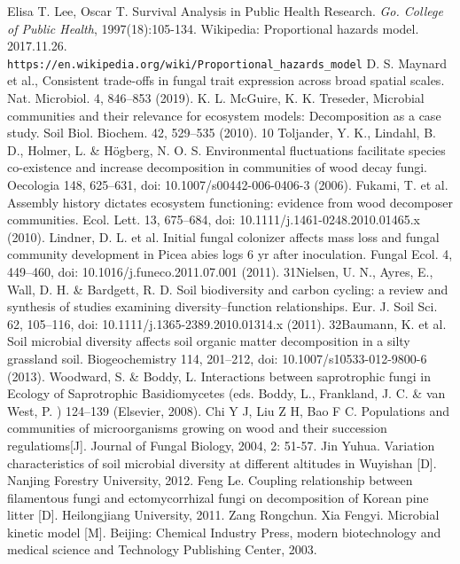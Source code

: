 \documentclass[12pt]{article}
\begin{document}
\begin{thebibliography}{99} 
Elisa T. Lee, Oscar T. Survival Analysis in Public Health Research. \emph{Go. College of Public Health}, 1997(18):105-134.
Wikipedia: Proportional hazards model. 2017.11.26. \texttt{\\https://en.wikipedia.org/wiki/Proportional\_{}hazards\_{}model}
D. S. Maynard et al., Consistent trade-offs in fungal trait expression across broad
spatial scales. Nat. Microbiol. 4, 846–853 (2019).
K. L. McGuire, K. K. Treseder, Microbial communities and their relevance for ecosystem models: Decomposition as a case study. Soil Biol. Biochem. 42, 529–535 (2010).
10 Toljander, Y. K., Lindahl, B. D., Holmer, L. \& Högberg, N. O. S. Environmental fluctuations facilitate species co-existence and increase decomposition in communities of wood decay fungi. Oecologia 148, 625–631, doi: 10.1007/s00442-006-0406-3 (2006).
Fukami, T. et al. Assembly history dictates ecosystem functioning: evidence from wood decomposer communities. Ecol. Lett. 13, 675–684, doi: 10.1111/j.1461-0248.2010.01465.x (2010).
Lindner, D. L. et al. Initial fungal colonizer affects mass loss and fungal community development in Picea abies logs 6 yr after inoculation. Fungal Ecol. 4, 449–460, doi: 10.1016/j.funeco.2011.07.001 (2011).
31Nielsen, U. N., Ayres, E., Wall, D. H. \& Bardgett, R. D. Soil biodiversity and carbon cycling: a review and synthesis of studies examining diversity–function relationships. Eur. J. Soil Sci. 62, 105–116, doi: 10.1111/j.1365-2389.2010.01314.x (2011).
32Baumann, K. et al. Soil microbial diversity affects soil organic matter decomposition in a silty grassland soil. Biogeochemistry 114, 201–212, doi: 10.1007/s10533-012-9800-6 (2013).
Woodward, S. \& Boddy, L. Interactions between saprotrophic fungi in Ecology of Saprotrophic Basidiomycetes (eds. Boddy, L., Frankland, J. C. \& van West, P. ) 124–139 (Elsevier, 2008).
Chi Y J, Liu Z H, Bao F C. Populations and communities of microorganisms growing on wood and their succession regulatioms[J]. Journal of Fungal Biology, 2004, 2: 51-57.
Jin Yuhua. Variation characteristics of soil microbial diversity at different altitudes in Wuyishan [D]. Nanjing Forestry University, 2012.
Feng Le. Coupling relationship between filamentous fungi and ectomycorrhizal fungi on decomposition of Korean pine litter [D]. Heilongjiang University, 2011.
Zang Rongchun. Xia Fengyi. Microbial kinetic model [M]. Beijing: Chemical Industry Press, modern biotechnology and medical science and Technology Publishing Center, 2003.
\end{thebibliography}
\end{document}
